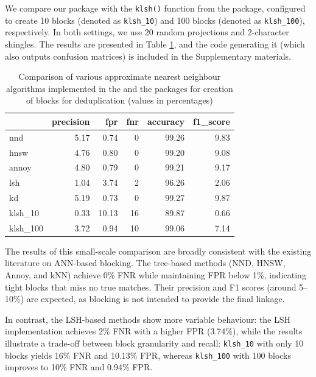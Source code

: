 We compare our package with the \texttt{klsh()} function from the
 package, configured to create 10 blocks (denoted as
\texttt{klsh\_10}) and 100 blocks (denoted as \texttt{klsh\_100}), respectively. In both
settings, we use 20 random projections and 2-character shingles. The
results are presented in Table
\ref{tab:table-latex},
and the code generating it (which also outputs confusion matrices) is
included in the Supplementary materials.

\begin{table}

\caption{\label{tab:table-latex}Comparison of various approximate nearest neighbour algorithms implemented in the  and the  packages for creation of blocks for deduplication (values in percentages)}
\centering
\begin{tabular}[t]{l|r|r|r|r|r}
\hline
  & precision & fpr & fnr & accuracy & f1\_score\\
\hline
nnd & 5.17 & 0.74 & 0 & 99.26 & 9.83\\
\hline
hnsw & 4.76 & 0.80 & 0 & 99.20 & 9.08\\
\hline
annoy & 4.80 & 0.79 & 0 & 99.21 & 9.17\\
\hline
lsh & 1.04 & 3.74 & 2 & 96.26 & 2.06\\
\hline
kd & 5.19 & 0.73 & 0 & 99.27 & 9.87\\
\hline
klsh\_10 & 0.33 & 10.13 & 16 & 89.87 & 0.66\\
\hline
klsh\_100 & 3.72 & 0.94 & 10 & 99.06 & 7.14\\
\hline
\end{tabular}
\end{table}

The results of this small-scale comparison are broadly consistent with the existing literature on ANN-based blocking. The tree-based methods (NND, HNSW, Annoy, and kNN) achieve 0\% FNR while maintaining FPR below 1\%, indicating tight blocks that miss no true matches. Their precision and F1 scores (around 5--10\%) are expected, as blocking is not intended to provide the final linkage.

In contrast, the LSH-based methods show more variable behaviour: the  LSH implementation achieves 2\% FNR with a higher FPR (3.74\%), while the  results illustrate a trade-off between block granularity and recall: \texttt{klsh\_10} with only 10 blocks yields 16\% FNR and 10.13\% FPR, whereas \texttt{klsh\_100} with 100 blocks improves to 10\% FNR and 0.94\% FPR.

